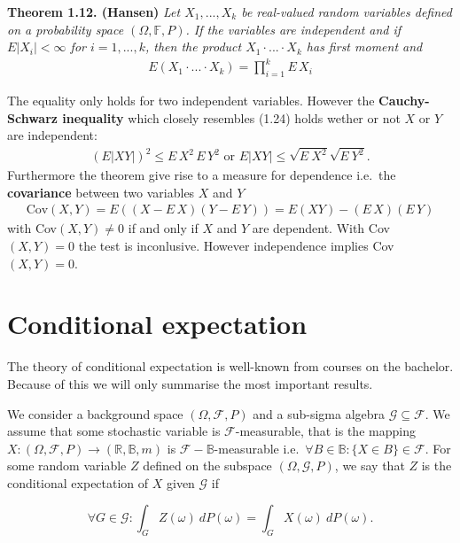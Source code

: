 \documentclass[a4paper,10pt,openany]{book}
\begin{document}
\textbf{Theorem 1.12. (Hansen)} \emph{Let \(X_1,...,X_k\) be real-valued random variables defined on a probability space \((\Omega, \mathbb{F},P)\). If the variables are independent and if \(E\vert X_i\vert<\infty\) for \(i=1,...,k\), then the product \(X_1\cdot ...\cdot X_k\) has first moment and}
\begin{align*}
    E\left(X_1\cdot ... \cdot X_k\right)=\prod_{i=1}^kE\, X_i\tag{1.24}
\end{align*}

The equality only holds for two independent variables. However the \textbf{Cauchy-Schwarz inequality} which closely resembles (1.24) holds wether or not \(X\) or \(Y\) are independent:
\begin{align*}
    \left(E\vert XY\vert\right)^2\le E\, X^2\, E\, Y^2\text{ or }E\vert XY\vert \le \sqrt{E\ X^2}\sqrt{E\ Y^2}.\tag{1.25}
\end{align*}
Furthermore the theorem give rise to a measure for dependence i.e.~the \textbf{covariance} between two variables \(X\) and \(Y\)
\begin{align*}
    \text{Cov}(X,Y)=E\left((X-E\,X)(Y-E\,Y)\right)=E(XY)-(E\, X)(E\, Y)\tag{1.26}
\end{align*}
with Cov\((X,Y)\ne 0\) if and only if \(X\) and \(Y\) are dependent. With Cov\((X,Y)=0\) the test is inconlusive. However independence implies Cov\((X,Y)=0\).

\hypertarget{conditional-expectation}{%
\section{Conditional expectation}\label{conditional-expectation}}

The theory of conditional expectation is well-known from courses on the bachelor. Because of this we will only summarise the most important results.

We consider a background space \((\Omega,\mathcal{F},P)\) and a sub-sigma algebra \(\mathcal{G}\subseteq \mathcal{F}\). We assume that some stochastic variable is \(\mathcal{F}\)-measurable, that is the mapping \(X : (\Omega,\mathcal{F},P) \to (\mathbb{R},\mathbb{B},m)\) is \(\mathcal{F}-\mathbb{B}\)-measurable i.e.~\(\forall B\in\mathbb{B} : \{X\in B\}\in\mathcal{F}\). For some random variable \(Z\) defined on the subspace \((\Omega,\mathcal{G},P)\), we say that \(Z\) is the conditional expectation of \(X\) given \(\mathcal{G}\) if

\[
\forall G\in\mathcal{G} : \int_G Z(\omega)\ dP(\omega)=\int_G X(\omega)\ dP(\omega).
\]
\end{document}
